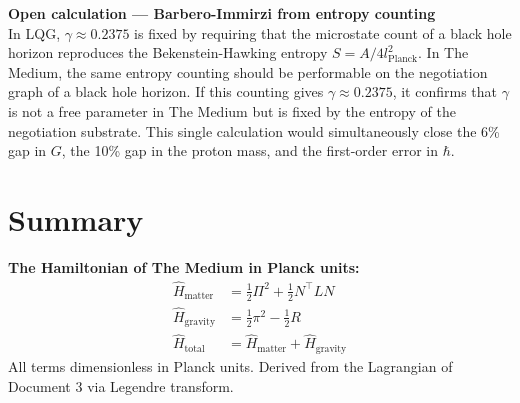 \documentclass[11pt,letterpaper]{article}
\newenvironment{openbox}{\begin{tcolorbox}[colback=orange!5!white,colframe=orange!60!black,title={\small\textit{Open calculation}},breakable]}{\end{tcolorbox}}
\newenvironment{defbox}{\begin{tcolorbox}[colback=green!3!white,colframe=green!45!black,title={\small\textit{Foundational definition}},breakable]}{\end{tcolorbox}}
\begin{document}
\begin{openbox}
\textbf{Open calculation --- Barbero-Immirzi from entropy counting}\\[4pt]
In LQG, $\gamma \approx 0.2375$ is fixed by requiring that the microstate count of a black hole horizon reproduces the Bekenstein-Hawking entropy $S = A/4l_\text{Planck}^2$. In The Medium, the same entropy counting should be performable on the negotiation graph of a black hole horizon. If this counting gives $\gamma \approx 0.2375$, it confirms that $\gamma$ is not a free parameter in The Medium but is fixed by the entropy of the negotiation substrate. This single calculation would simultaneously close the 6\% gap in $G$, the 10\% gap in the proton mass, and the first-order error in $\hbar$.
\end{openbox}

\section{Summary}
\label{sec:org9a5d0d6}

\begin{defbox}
\textbf{The Hamiltonian of The Medium in Planck units:}
\begin{align*}
\hat{H}_\text{matter} &= \tfrac{1}{2}\Pi^2 + \tfrac{1}{2}N^\top L N\\
\hat{H}_\text{gravity} &= \tfrac{1}{2}\pi^2 - \tfrac{1}{2}R\\
\hat{H}_\text{total} &= \hat{H}_\text{matter} + \hat{H}_\text{gravity}
\end{align*}
All terms dimensionless in Planck units. Derived from the Lagrangian of Document 3 via Legendre transform.
\end{defbox}
\end{document}
